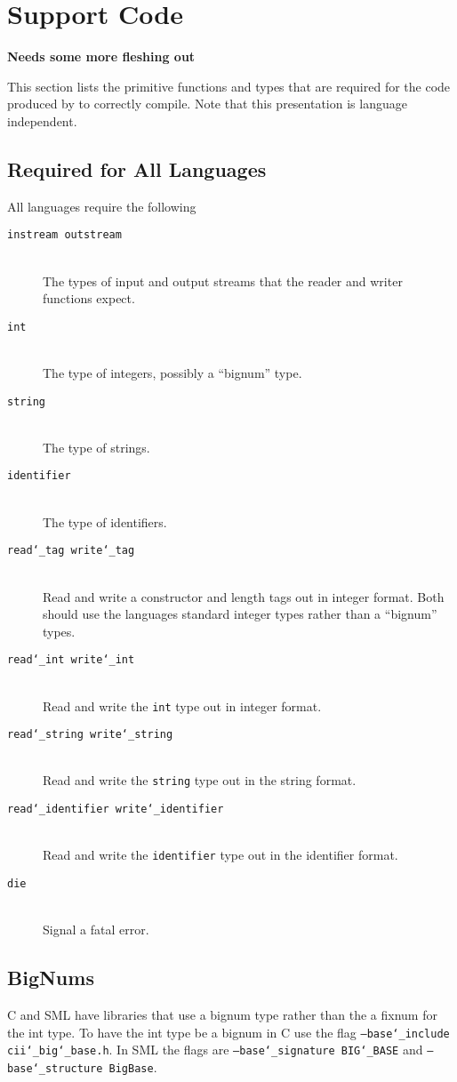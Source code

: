 %
\chapter{Support Code}
\label{chap:support-code}

\textbf{Needs some more fleshing out}

This section lists the primitive functions and types that are required for
the code produced by \asdlgen{} to correctly compile.
Note that this presentation is language independent. 

\section{Required for All Languages}
All languages require the following
\newcommand{\ITEM}[1]{\item[\normalfont\color{\cdColor}\texttt{#1}]}
\begin{description}
  \ITEM{instream outstream} \mbox{}\\
    The types of input and output streams that the reader and writer functions expect.
  \ITEM{int} \mbox{}\\
    The type of integers, possibly a ``bignum'' type.
  \ITEM{string} \mbox{}\\
    The type of strings.
  \ITEM{identifier} \mbox{}\\
    The type of identifiers.
  \ITEM{read\char`\_tag write\char`\_tag} \mbox{}\\
    Read and write a constructor and length tags out in \asdl{} integer format.
    Both should use the languages standard integer types rather than a ``bignum'' types.
  \ITEM{read\char`\_int write\char`\_int} \mbox{}\\
    Read and write the \lstinline!int! type out in \asdl{} integer format.
  \ITEM{read\char`\_string write\char`\_string} \mbox{}\\
    Read and write the \lstinline!string! type out in the \asdl{} string format.
  \ITEM{read\char`\_identifier write\char`\_identifier} \mbox{}\\
    Read and write the \lstinline!identifier! type out in the \asdl{} identifier format.
  \ITEM{die} \mbox{}\\
    Signal a fatal error.
\end{description}%

\section{BigNums}
C and SML have libraries that use a bignum type
rather than the a fixnum for the \asdl{} int type. To have the int type
be a bignum in C use the flag \texttt{--base\char`\_include cii\char`\_big\char`\_base.h}. In
SML the flags are \texttt{--base\char`\_signature BIG\char`\_BASE} and
\texttt{--base\char`\_structure BigBase}.

